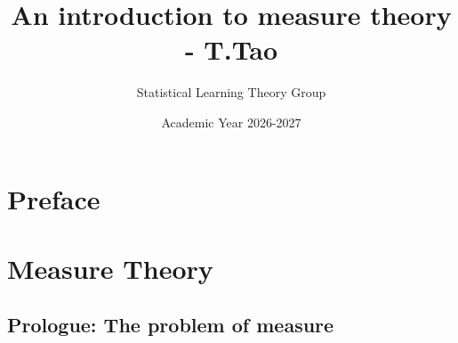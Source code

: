 \documentclass[12pt, oneside]{book}
\title{An introduction to measure theory - T.Tao}
\author{Statistical Learning Theory Group}
\date{Academic Year 2026-2027}
\numberwithin{equation}{chapter}
\begin{document}
\maketitle
\tableofcontents

\vspace{.25in}


\chapter*{Preface}



\chapter{Measure Theory}
\section{Prologue: The problem of measure}




\end{document}

